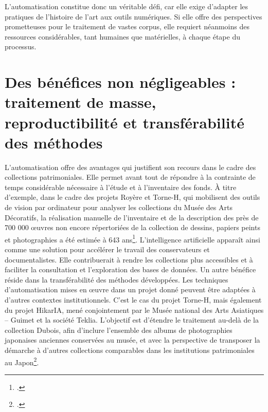 L’automatisation constitue donc un véritable défi, car elle exige d’adapter les pratiques de l’histoire de l’art aux outils numériques. Si elle offre des perspectives prometteuses pour le traitement de vastes corpus, elle requiert néanmoins des ressources considérables, tant humaines que matérielles, à chaque étape du processus.

\section[Bénéfices]{Des bénéfices non négligeables : traitement de masse, reproductibilité et transférabilité des méthodes}

L’automatisation offre des avantages qui justifient son recours dans le cadre des collections patrimoniales. Elle permet avant tout de répondre à la contrainte de temps considérable nécessaire à l’étude et à l’inventaire des fonds. À titre d’exemple, dans le cadre des projets Royère et Torne-H, qui mobilisent des outils de vision par ordinateur pour analyser les collections du Musée des Arts Décoratifs, la réalisation manuelle de l’inventaire et de la description des près de 700 000 œuvres non encore répertoriées de la collection de dessins, papiers peints et photographies a été estimée à 643 ans\footcite{bermesRepenserCollectionsPatrimoniales2025}. L’intelligence artificielle apparaît ainsi comme une solution pour accélérer le travail des conservateurs et documentalistes. Elle contribuerait à rendre les collections plus accessibles et à faciliter la consultation et l’exploration des bases de données. Un autre bénéfice réside dans la transférabilité des méthodes développées. Les techniques d’automatisation mises en œuvre dans un projet donné peuvent être adaptées à d’autres contextes institutionnels. C’est le cas du projet Torne-H, mais également du projet HikarIA, mené conjointement par le Musée national des Arts Asiatiques – Guimet et la société Teklia. L’objectif est d’étendre le traitement au-delà de la collection Dubois, afin d’inclure l’ensemble des albums de photographies japonaises anciennes conservées au musée, et avec la perspective de transposer la démarche à d’autres collections comparables dans les institutions patrimoniales au Japon\footcite{kermorvantProjetHikarIAAnalyse2025}.

